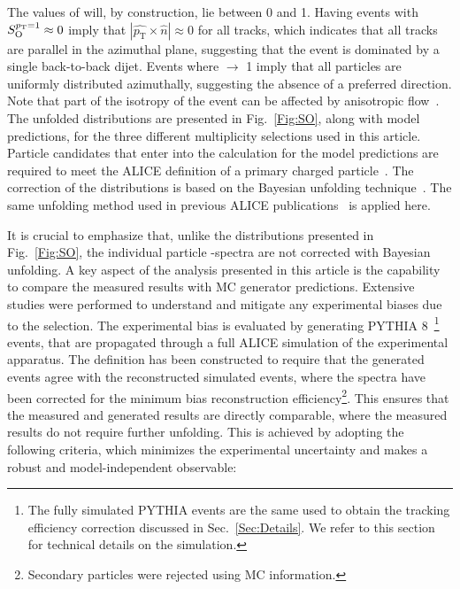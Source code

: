 The values of \SOPT will, by construction, lie between 0 and 1. Having events with $S_{\text{O}}^{p_{\rm T}=1} \approx 0$ imply that $|\hat{p_{\textrm{T}}} \times \hat{n}| \approx 0$ for all tracks, which indicates that all tracks are parallel in the azimuthal plane, suggesting that the event is dominated by a single back-to-back dijet. Events where \SOPT $\rightarrow$ 1 imply that all particles are uniformly distributed azimuthally, suggesting the absence of a preferred direction. Note that part of the isotropy of the event can be affected by anisotropic flow~\cite{Ref:Flow1}. The unfolded \SOPT distributions are presented in Fig.~\ref{Fig:SO}, along with model predictions, for the three different multiplicity selections used in this article. Particle candidates that enter into the \SOPT calculation for the model predictions are required to meet the ALICE definition of a primary charged particle~\cite{alice_primary}.  The correction of the \SOPT distributions is based on the Bayesian unfolding technique~\cite{DAgostini:1994fjx}. The same unfolding method used in previous ALICE publications~\cite{ALICE:2023yuk} is applied here.

It is crucial to emphasize that, unlike the distributions presented in Fig.~\ref{Fig:SO}, the individual particle \pt-spectra are not corrected with Bayesian unfolding.
A key aspect of the analysis presented in this article is the capability to compare the measured results with MC generator predictions. Extensive studies were performed to understand and mitigate any experimental biases due to the \SOPT selection. The experimental bias is evaluated by generating PYTHIA 8~\footnote{The fully simulated PYTHIA events are the same used to obtain the tracking efficiency correction discussed in Sec.~\ref{Sec:Details}. We refer to this section for technical details on the simulation.} events, that are propagated through a full ALICE simulation of the experimental apparatus. The \SOPT definition has been constructed to require that the generated events agree with the reconstructed simulated events, where the \pt spectra have been corrected for the minimum bias reconstruction efficiency\footnote{Secondary particles were rejected using MC information.}. This ensures that the measured and generated results are directly comparable, where the measured results do not require further unfolding. This is achieved by adopting the following criteria, which minimizes the experimental uncertainty and makes \SOPT a robust and model-independent observable:


